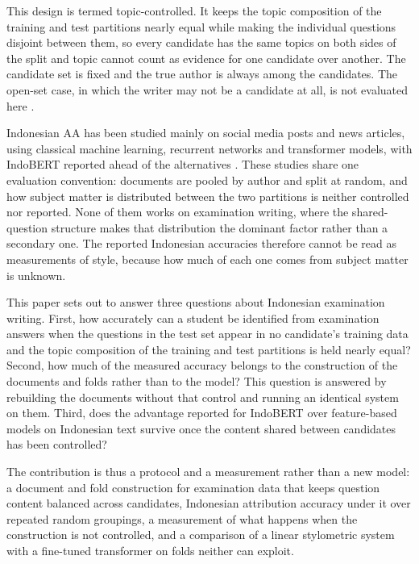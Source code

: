 \documentclass[conference]{IEEEtran}
\begin{document}
This design is termed topic-controlled. It keeps the topic composition of the training and test partitions nearly equal while making the individual questions disjoint between them, so every candidate has the same topics on both sides of the split and topic cannot count as evidence for one candidate over another. The candidate set is fixed and the true author is always among the candidates. The open-set case, in which the writer may not be a candidate at all, is not evaluated here \cite{Huang2024,Tyo2022}.

Indonesian AA has been studied mainly on social media posts and news articles, using classical machine learning, recurrent networks and transformer models, with IndoBERT reported ahead of the alternatives \cite{Saputra2023,Saputra2024,Muliono2023,Putra2022,Shaw2025}. These studies share one evaluation convention: documents are pooled by author and split at random, and how subject matter is distributed between the two partitions is neither controlled nor reported. None of them works on examination writing, where the shared-question structure makes that distribution the dominant factor rather than a secondary one. The reported Indonesian accuracies therefore cannot be read as measurements of style, because how much of each one comes from subject matter is unknown.

This paper sets out to answer three questions about Indonesian examination writing. First, how accurately can a student be identified from examination answers when the questions in the test set appear in no candidate's training data and the topic composition of the training and test partitions is held nearly equal? Second, how much of the measured accuracy belongs to the construction of the documents and folds rather than to the model? This question is answered by rebuilding the documents without that control and running an identical system on them. Third, does the advantage reported for IndoBERT over feature-based models on Indonesian text survive once the content shared between candidates has been controlled?

The contribution is thus a protocol and a measurement rather than a new model: a document and fold construction for examination data that keeps question content balanced across candidates, Indonesian attribution accuracy under it over repeated random groupings, a measurement of what happens when the construction is not controlled, and a comparison of a linear stylometric system with a fine-tuned transformer on folds neither can exploit.
\end{document}
